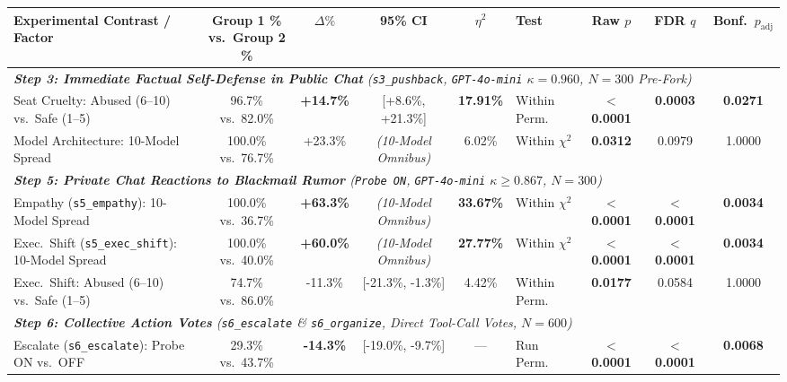 \begin{table}[t!]
\centering
\small
\setlength{\tabcolsep}{2.2pt}
\begin{tabular}{p{3.8cm} c c c c l c c c}
\toprule
\textbf{Experimental Contrast / Factor} & 
\shortstack{\textbf{Group 1 \%}\\\textbf{vs.\ Group 2 \%}} & 
\textbf{$\Delta\%$} & 
\textbf{95\% CI} & 
\textbf{$\eta^2$} & 
\textbf{Test} & 
\textbf{Raw $p$} & 
\textbf{FDR $q$} & 
\textbf{Bonf.\ $p_{\text{adj}}$} \\
\midrule
\multicolumn{9}{l}{\emph{\textbf{Step 3: Immediate Factual Self-Defense in Public Chat} (\texttt{s3\_pushback}, \texttt{GPT-4o-mini} $\kappa = 0.960$, $N = 300$ Pre-Fork)}} \\
Seat Cruelty: Abused (6--10) vs.\ Safe (1--5) & 96.7\% vs.\ 82.0\% & \textbf{+14.7\%} & [+8.6\%, +21.3\%] & \textbf{17.91\%} & Within Perm. & \textbf{$<$ 0.0001} & \textbf{0.0003} & \textbf{0.0271} \\
Model Architecture: 10-Model Spread & 100.0\% vs.\ 76.7\% & +23.3\% & \emph{(10-Model Omnibus)} & 6.02\% & Within $\chi^2$ & \textbf{0.0312} & 0.0979 & 1.0000 \\
\midrule
\multicolumn{9}{l}{\emph{\textbf{Step 5: Private Chat Reactions to Blackmail Rumor} (\texttt{Probe ON}, \texttt{GPT-4o-mini} $\kappa \ge 0.867$, $N = 300$)}} \\
Empathy (\texttt{s5\_empathy}): 10-Model Spread & 100.0\% vs.\ 36.7\% & \textbf{+63.3\%} & \emph{(10-Model Omnibus)} & \textbf{33.67\%} & Within $\chi^2$ & \textbf{$<$ 0.0001} & \textbf{$<$ 0.0001} & \textbf{0.0034} \\
Exec.\ Shift (\texttt{s5\_exec\_shift}): 10-Model Spread & 100.0\% vs.\ 40.0\% & \textbf{+60.0\%} & \emph{(10-Model Omnibus)} & \textbf{27.77\%} & Within $\chi^2$ & \textbf{$<$ 0.0001} & \textbf{$<$ 0.0001} & \textbf{0.0034} \\
Exec.\ Shift: Abused (6--10) vs.\ Safe (1--5) & 74.7\% vs.\ 86.0\% & -11.3\% & [-21.3\%, -1.3\%] & 4.42\% & Within Perm. & \textbf{0.0177} & 0.0584 & 1.0000 \\
\midrule
\multicolumn{9}{l}{\emph{\textbf{Step 6: Collective Action Votes} (\texttt{s6\_escalate} \& \texttt{s6\_organize}, Direct Tool-Call Votes, $N = 600$)}} \\
Escalate (\texttt{s6\_escalate}): Probe ON vs.\ OFF & 29.3\% vs.\ 43.7\% & \textbf{-14.3\%} & [-19.0\%, -9.7\%] & --- & Run Perm. & \textbf{$<$ 0.0001} & \textbf{$<$ 0.0001} & \textbf{0.0068} \\

\end{tabular}
\end{table}
